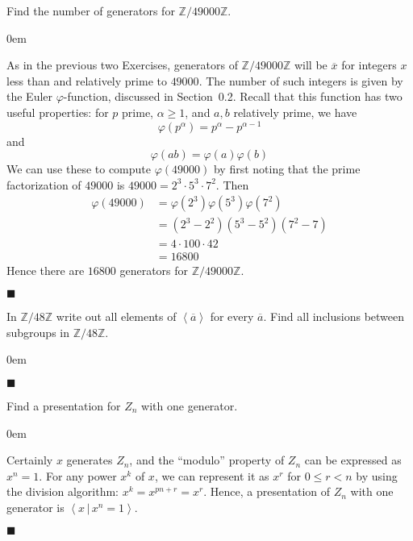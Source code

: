 \documentclass[12pt]{article}
\renewcommand{\qed}{\hfill$\blacksquare$}
\renewenvironment{proof}{\begin{addmargin}[1em]{0em}\begin{newproof}}{\end{newproof}\end{addmargin}\qed}
\newenvironment{problem}[2][Exercise]{\begin{trivlist}
\item[\hskip \labelsep {\bfseries #1}\hskip \labelsep {\bfseries #2.}]}{\end{trivlist}}
\begin{document}
\begin{problem}{2.3.5}
Find the number of generators for $\mathbb{Z}/49000 \mathbb{Z}$.
\end{problem}
\begin{proof}
As in the previous two Exercises, generators of $\mathbb{Z}/49000\mathbb{Z}$ will be $\overline{x}$ for integers $x$ less than and relatively prime to $49000$. The number of such integers is given by the Euler $\varphi$-function, discussed in Section~0.2. Recall that this function has two useful properties: for $p$ prime, $\alpha \geq 1$, and $a,b$ relatively prime, we have \[ \varphi\left(p^{\alpha}\right) = p^{\alpha}-p^{\alpha-1} \] and \[ \varphi\left(ab\right)=\varphi\left(a\right)\varphi\left(b\right) \] We can use these to compute $\varphi\left(49000\right)$ by first noting that the prime factorization of $49000$ is $49000 = 2^3 \cdot 5^3 \cdot 7^2$. Then
\begin{equation}\begin{split}
\varphi\left(49000\right) &=\varphi\left(2^3\right)\varphi\left(5^3\right)\varphi\left(7^2\right) \\
& = \left(2^3 - 2^2\right)\left(5^3-5^2\right)\left(7^2-7\right) \\
& = 4\cdot 100 \cdot 42 \\
& = 16800
\end{split}\end{equation}
Hence there are $16800$ generators for $\mathbb{Z}/49000\mathbb{Z}$.
\end{proof}


\begin{problem}{2.3.6}
In $\mathbb{Z}/48\mathbb{Z}$ write out all elements of $\left\langle \overline{a} \right\rangle $ for every $\overline{a}$. Find all inclusions between subgroups in $\mathbb{Z}/48\mathbb{Z}$. 
\end{problem}
\begin{proof}

\end{proof}




\begin{problem}{2.3.17}
Find a presentation for $Z_n$ with one generator.
\end{problem}
\begin{proof}
Certainly $x$ generates $Z_n$, and the ``modulo'' property of $Z_n$ can be expressed as $x^n = 1$. For any power $x^k$ of $x$, we can represent it as $x^r$ for $0\leq r < n$ by using the division algorithm: $x^k = x^{pn+r} = x^r$. Hence, a presentation of $Z_n$ with one generator is $\left\langle x\, | \, x^n=1\right\rangle$.
\end{proof}
\end{document}
